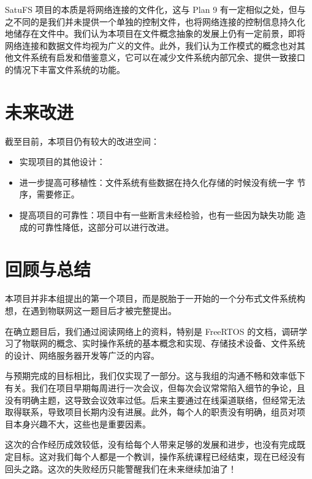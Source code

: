 \documentclass{ctexart}
\begin{document}
SatuFS 项目的本质是将网络连接的文件化，这与 Plan 9 有一定相似之处，但与
之不同的是我们并未提供一个单独的控制文件，也将网络连接的控制信息持久化
地储存在文件中。我们认为本项目在文件概念抽象的发展上仍有一定前景，即将
网络连接和数据文件均视为广义的文件。此外，我们认为工作模式的概念也对其
他文件系统有启发和借鉴意义，它可以在减少文件系统内部冗余、提供一致接口
的情况下丰富文件系统的功能。

\section{未来改进}
\label{sec:future}

截至目前，本项目仍有较大的改进空间：

\begin{itemize}
\item 实现项目的其他设计：
\item 进一步提高可移植性：文件系统有些数据在持久化存储的时候没有统一字
  节序，需要修正。
\item 提高项目的可靠性：项目中有一些断言未经检验，也有一些因为缺失功能
  造成的可靠性降低，这部分可以进行改进。
\end{itemize}

\section{回顾与总结}
\label{sec:conclusion}

本项目并非本组提出的第一个项目，而是脱胎于一开始的一个分布式文件系统构
想，在遇到物联网这一题目后才被完整提出。

在确立题目后，我们通过阅读网络上的资料，特别是 FreeRTOS 的文档，调研学
习了物联网的概念、实时操作系统的基本概念和实现、存储技术设备、文件系统
的设计、网络服务器开发等广泛的内容。

与预期完成的目标相比，我们仅实现了一部分。这与我组的沟通不畅和效率低下
有关。我们在项目早期每周进行一次会议，但每次会议常常陷入细节的争论，且
没有明确主题，这导致会议效率过低。后来主要通过在线渠道联络，但经常无法
取得联系，导致项目长期内没有进展。此外，每个人的职责没有明确，组员对项
目本身兴趣不大，这些也是重要因素。

这次的合作经历成效较低，没有给每个人带来足够的发展和进步，也没有完成既
定目标。这对我们每个人都是一个教训，操作系统课程已经结束，现在已经没有
回头之路。这次的失败经历只能警醒我们在未来继续加油了！
\end{document}
